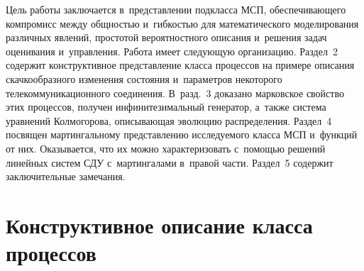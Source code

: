 \begin{multicols}{2}
Цель работы заключается в~представлении подкласса МСП, обеспечивающего 
компромисс между общностью и~гибкостью для математического моделирования 
различных явлений, простотой вероятностного описания и~решения задач оценивания и~управ\-ле\-ния. Работа имеет следующую организа\-цию. Раздел~2 содержит 
конструктивное представ\-ле\-ние класса процессов на примере описания 
скачкообразного изменения состояния и~па\-ра\-мет\-ров некоторого 
телекоммуникационного соединения. В~разд.~3 доказано марковское свойство этих %
процессов, получен инфинитезимальный генератор, а~также сис\-те\-ма уравнений 
Колмогорова, описывающая эволюцию распределения. Раздел~4 %
посвящен 
мартингальному представлению ис\-сле\-ду\-емо\-го класса МСП и~функций от них. 
Оказывается, что их можно характеризовать с~по\-мощью решений линейных сис\-тем 
СДУ с~мартингалами в~правой части. 
Раздел~5 содержит заключительные замечания.

\section{Конструктивное описание класса процессов}


\end{multicols}
